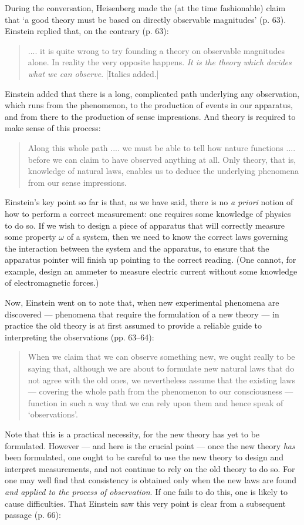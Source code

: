 \documentclass[12pt]{article}%
\begin{document}
During the conversation, Heisenberg made the (at the time fashionable) claim
that `a good theory must be based on directly observable magnitudes' (p. 63).
Einstein replied that, on the contrary (p. 63):

\begin{quote}
.... it is quite wrong to try founding a theory on observable magnitudes
alone. In reality the very opposite happens. \textit{It is the theory which
decides what we can observe}. [Italics added.]
\end{quote}
Einstein added that there is a long, complicated path underlying any
observation, which runs from the phenomenon, to the production of events in
our apparatus, and from there to the production of sense impressions. And
theory is required to make sense of this process:

\begin{quote}
Along this whole path .... we must be able to tell how nature functions ....
before we can claim to have observed anything at all. Only theory, that is,
knowledge of natural laws, enables us to deduce the underlying phenomena from
our sense impressions.
\end{quote}
Einstein's key point so far is that, as we have said, there is no
\textit{a priori} notion of how to perform a correct measurement: one requires
some knowledge of physics to do so. If we wish to design a piece of apparatus
that will correctly measure some property $\omega$ of a system, then we need
to know the correct laws governing the interaction between the system and the
apparatus, to ensure that the apparatus pointer will finish up pointing to the
correct reading. (One cannot, for example, design an ammeter to measure
electric current without some knowledge of electromagnetic forces.)

Now, Einstein went on to note that, when new experimental phenomena are
discovered --- phenomena that require the formulation of a new theory --- in
practice the old theory is at first assumed to provide a reliable guide to
interpreting the observations (pp. 63--64):

\begin{quote}
When we claim that we can observe something new, we ought really to be saying
that, although we are about to formulate new natural laws that do not agree
with the old ones, we nevertheless assume that the existing laws --- covering
the whole path from the phenomenon to our consciousness --- function in such a
way that we can rely upon them and hence speak of `observations'.
\end{quote}
Note that this is a practical necessity, for the new theory has yet to
be formulated. However --- and here is the crucial point --- once the new
theory \textit{has} been formulated, one ought to be careful to use the new
theory to design and interpret measurements, and not continue to rely on the
old theory to do so. For one may well find that consistency is obtained only
when the new laws are found \textit{and applied to the process of
observation}. If one fails to do this, one is likely to cause difficulties.
That Einstein saw this very point is clear from a subsequent passage (p. 66):
\end{document}
